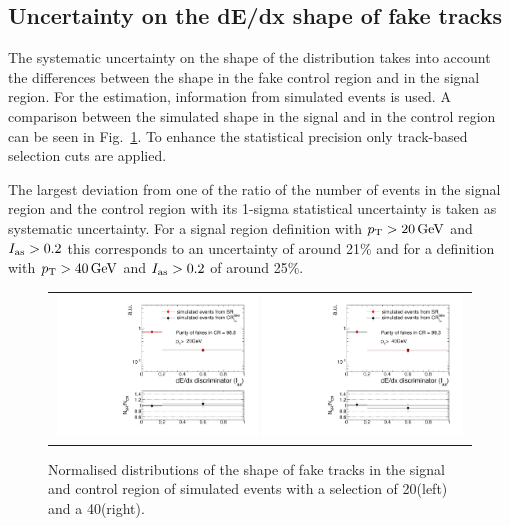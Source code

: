 \subsection{Uncertainty on the dE/dx shape of fake tracks}
\label{sec:FakeIasUncertainty}
The systematic uncertainty on the shape of the \ias distribution takes into account the differences between the \ias shape in the fake control region \fakeCR and in the signal region.
For the estimation, information from simulated \WJets events is used.
A comparison between the simulated \ias shape in the signal and in the control region can be seen in Fig.~\ref{fig:FakeIasUnc}.
To enhance the statistical precision only track-based selection cuts are applied.

The largest deviation from one of the ratio of the number of events in the signal region and the control region with its 1-sigma statistical uncertainty is taken as systematic uncertainty.
For a signal region definition with $p_{\text{T}}>20\,\text{Ge}\kern-0.06667em\text{V}$ and $I_{\text{as}}>0.2$ this corresponds to an uncertainty of around 21\% and for a definition with $p_{\text{T}}>40\,\text{Ge}\kern-0.06667em\text{V}$ and $I_{\text{as}}>0.2$ of around 25\%.
\begin{figure}[!h]
  \centering 
  \begin{tabular}{c}
    \includegraphics[width=0.49\textwidth]{figures/analysis/Background/hASmi_SRbinning_fakes_ECalaoLe5_trackPtGt20_MC_CR_MC_SR.pdf}
    \includegraphics[width=0.49\textwidth]{figures/analysis/Background/hASmi_SRbinning_fakes_ECalaoLe5_trackPtGt40_MC_CR_MC_SR.pdf}
  \end{tabular}
  \caption{Normalised distributions of the \ias shape of fake tracks in the signal and control region of simulated \WJets events with a \pt selection of 20\gev (left) and a 40\gev (right).}
  \label{fig:FakeIasUnc}
\end{figure}

